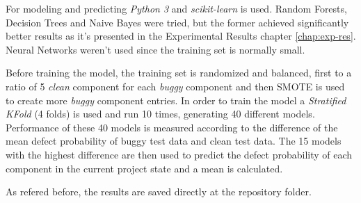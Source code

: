 For modeling and predicting \emph{Python 3} and \emph{scikit-learn} is used.
Random Forests, Decision Trees and Naive Bayes were tried, but the former achieved significantly better results as it's presented in the Experimental Results chapter \ref{chap:exp-res}.
Neural Networks weren't used since the training set is normally small.

Before training the model, the training set is randomized and balanced, first to a ratio of 5 \emph{clean} component for each \emph{buggy} component 
and then SMOTE is used to create more \emph{buggy} component entries. In order to train the model a \emph{Stratified KFold} (4 folds) is used and run 10 times, 
generating 40 different models. Performance of these 40 models is measured according to the difference of the mean defect probability of buggy test data and clean test data. 
The 15 models with the highest difference are then used to predict the defect probability of each component in the current project state and a mean is calculated.

As refered before, the results are saved directly at the repository folder.
